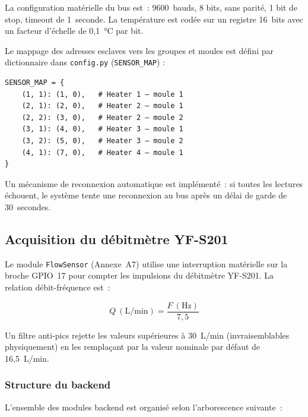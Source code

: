 La configuration matérielle du bus est~: 9600~bauds, 8 bits, sans parité, 1 bit de stop, timeout de 1~seconde. La température est codée sur un registre 16~bits avec un facteur d'échelle de 0,1~\si{\celsius} par bit.

Le mappage des adresses esclaves vers les groupes et moules est défini par dictionnaire dans \texttt{config.py} (\texttt{SENSOR\_MAP}) :

\begin{center}
\begin{minipage}{0.70\textwidth}
\begin{verbatim}
SENSOR_MAP = {
    (1, 1): (1, 0),   # Heater 1 — moule 1
    (2, 1): (2, 0),   # Heater 2 — moule 1
    (2, 2): (3, 0),   # Heater 2 — moule 2
    (3, 1): (4, 0),   # Heater 3 — moule 1
    (3, 2): (5, 0),   # Heater 3 — moule 2
    (4, 1): (7, 0),   # Heater 4 — moule 1
}
\end{verbatim}
\end{minipage}
\end{center}

Un mécanisme de reconnexion automatique est implémenté~: si toutes les lectures échouent, le système tente une reconnexion au bus après un délai de garde de 30~secondes.

\subsection{Acquisition du débitmètre YF-S201}

Le module \texttt{FlowSensor} (Annexe~A7) utilise une interruption matérielle sur la broche GPIO~17 pour compter les impulsions du débitmètre YF-S201. La relation débit-fréquence est~:

\[
Q~(\text{L/min}) = \frac{F~(\text{Hz})}{7,5}
\]

Un filtre anti-pics rejette les valeurs supérieures à 30~L/min (invraisemblables physiquement) en les remplaçant par la valeur nominale par défaut de 16,5~L/min.

\subsubsection{Structure du backend}

L'ensemble des modules backend est organisé selon l'arborescence suivante~:

